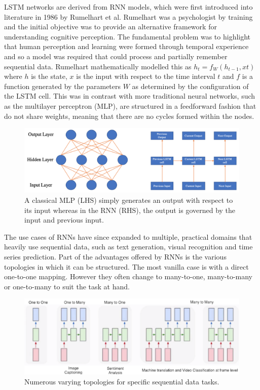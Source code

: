 \documentclass[10pt,onecolumn,letterpaper]{article}
\begin{document}
LSTM networks are derived from RNN models, which were first introduced into literature\cite{Rumelhart} in 1986 by Rumelhart et al. Rumelhart was a psychologist by training and the initial objective was to provide an alternative framework for understanding cognitive perception. The fundamental problem was to highlight that human perception and learning were formed through temporal experience and so a model was required that could process and partially remember sequential data. Rumelhart mathematically modelled this as $h_{t} = f_{W} (h_{t-1}, x{t})$ where $h$ is the state, $x$ is the input with respect to the time interval $t$ and $f$ is a function generated by the parameters $W$ as determined by the configuration of the LSTM cell. This was in contrast with more traditional neural networks, such as the multilayer perceptron (MLP), are structured in a feedforward fashion that do not share weights, meaning that there are no cycles formed within the nodes. 

\begin{figure}[!hbt!]
\centering
\includegraphics[width=14.5cm]{mlp_rnn_comparison.png}
\caption{A classical MLP (LHS) simply generates an output with respect to its input whereas in the RNN (RHS), the output is governed by the input and previous input.}
\end{figure}

The use cases of RNNs have since expanded to multiple, practical domains that heavily use sequential data, such as text generation, visual recognition and time series prediction. Part of the advantages offered by RNNs is the various topologies in which it can be structured. The most vanilla case is with a direct one-to-one mapping. However they often change to many-to-one, many-to-many or one-to-many to suit the task at hand. 

\begin{figure}[!hbt!]
\centering
\includegraphics[width=14.5cm]{rnn_topologies.png}
\caption{Numerous varying topologies for specific sequential data tasks.}
\end{figure}
\end{document}
